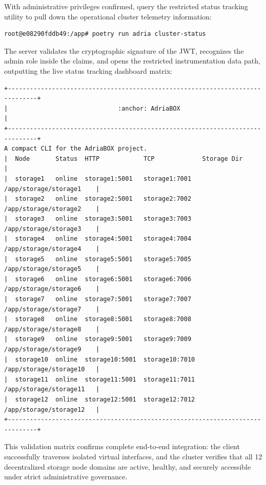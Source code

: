 With administrative privileges confirmed, query the restricted status tracking utility to pull down the operational cluster telemetry information:
\begin{lstlisting}[language=bash, keepspaces=true, columns=flexible]
root@e08290fddb49:/app# poetry run adria cluster-status
\end{lstlisting}
The server validates the cryptographic signature of the JWT, recognizes the admin role inside the claims, and opens the restricted instrumentation data path, outputting the live status tracking dashboard matrix:
\begin{lstlisting}[basicstyle=\small\ttfamily, breaklines=true, frame=single, keepspaces=true, columns=flexible]
+------------------------------------------------------------------------------+
|                              :anchor: AdriaBOX                               |
+------------------------------------------------------------------------------+
A compact CLI for the AdriaBOX project.                                         
|  Node       Status  HTTP            TCP             Storage Dir              |
|  storage1   online  storage1:5001   storage1:7001   /app/storage/storage1    |
|  storage2   online  storage2:5001   storage2:7002   /app/storage/storage2    |
|  storage3   online  storage3:5001   storage3:7003   /app/storage/storage3    |
|  storage4   online  storage4:5001   storage4:7004   /app/storage/storage4    |
|  storage5   online  storage5:5001   storage5:7005   /app/storage/storage5    |
|  storage6   online  storage6:5001   storage6:7006   /app/storage/storage6    |
|  storage7   online  storage7:5001   storage7:7007   /app/storage/storage7    |
|  storage8   online  storage8:5001   storage8:7008   /app/storage/storage8    |
|  storage9   online  storage9:5001   storage9:7009   /app/storage/storage9    |
|  storage10  online  storage10:5001  storage10:7010  /app/storage/storage10   |
|  storage11  online  storage11:5001  storage11:7011  /app/storage/storage11   |
|  storage12  online  storage12:5001  storage12:7012  /app/storage/storage12   |
+------------------------------------------------------------------------------+
\end{lstlisting}

This validation matrix confirms complete end-to-end integration: the client successfully traverses isolated virtual interfaces, and the cluster verifies that all 12 decentralized storage node domains are active, healthy, and securely accessible under strict administrative governance.

